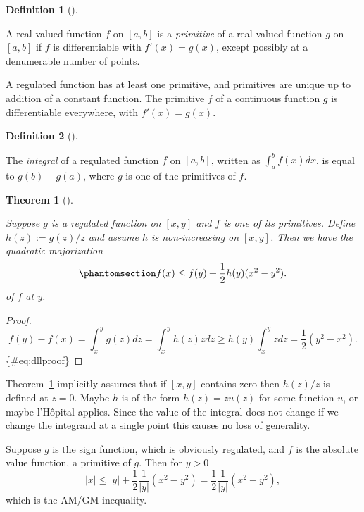 \documentclass[
  12pt,
  letterpaper,
  DIV=11,
  numbers=noendperiod]{scrartcl}
\theoremstyle{definition}
\newtheorem{definition}{Definition}[section]
\theoremstyle{plain}
\newtheorem{theorem}{Theorem}[section]
\theoremstyle{plain}
\theoremstyle{remark}
\begin{document}
\begin{definition}[]\protect\hypertarget{def-primitive}{}\label{def-primitive}

A real-valued function \(f\) on \([a,b]\) is a \emph{primitive} of a
real-valued function \(g\) on \([a,b]\) if \(f\) is differentiable with
\(f'(x)=g(x)\), except possibly at a denumerable number of points.

\end{definition}

A regulated function has at least one primitive, and primitives are
unique up to addition of a constant function. The primitive \(f\) of a
continuous function \(g\) is differentiable everywhere, with
\(f'(x)=g(x)\).

\begin{definition}[]\protect\hypertarget{def-integral}{}\label{def-integral}

The \emph{integral} of a regulated function \(f\) on \([a,b]\), written
as \(\int_a^b f(x)dx\), is equal to \(g(b)-g(a)\), where \(g\) is one of
the primitives of \(f\).

\end{definition}

\begin{theorem}[]\protect\hypertarget{thm-dll}{}\label{thm-dll}

Suppose \(g\) is a regulated function on \([x,y]\) and \(f\) is one of
its primitives. Define \(h(z):=g(z)/z\) and assume \(h\) is
non-increasing on \([x,y]\). Then we have the quadratic majorization
\begin{equation}\phantomsection\label{eq-amajor}{
f(x)\leq f(y)+\frac12h(y)(x^2-y^2).
}\end{equation} of \(f\) at \(y\).

\end{theorem}

\begin{proof}
\[
f(y)-f(x)=\int_x^y g(z)dz=\int_x^y h(z)zdz\geq h(y)\int_x^yzdz=\frac12(y^2-x^2).
\]\{\#eq:dllproof\}
\end{proof}

Theorem~\ref{thm-dll} implicitly assumes that if \([x,y]\) contains zero
then \(h(z)/z\) is defined at \(z=0\). Maybe \(h\) is of the form
\(h(z)=zu(z)\) for some function \(u\), or maybe l'Hôpital applies.
Since the value of the integral does not change if we change the
integrand at a single point this causes no loss of generality.

Suppose \(g\) is the sign function, which is obviously regulated, and
\(f\) is the absolute value function, a primitive of \(g\). Then for
\(y>0\) \[
|x|\leq|y|+\frac12\frac{1}{|y|}(x^2-y^2)=\frac12\frac{1}{|y|}(x^2+y^2),
\] which is the AM/GM inequality.
\end{document}
